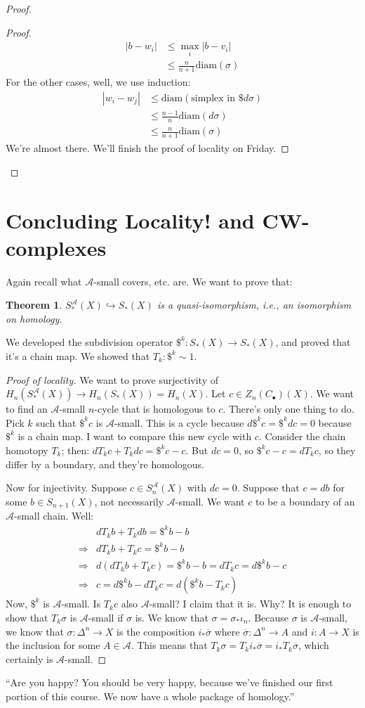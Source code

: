 \documentclass{amsart}
\theoremstyle{theorem}
\newtheorem{theorem}{Theorem}[section]
\theoremstyle{definition}
\newcommand{\sca}{\mathscr{A}}
\begin{document}
\begin{proof}
\begin{proof}
\begin{align*}
|b-w_i| & \leq\max_i|b-v_i|\\
 & \leq \frac{n}{n+1}\mathrm{diam}(\sigma)
\end{align*}
For the other cases, well, we use induction:
\begin{align*}
|w_i-w_j|& \leq \mathrm{diam}(\text{simplex in }\$d\sigma)\\
& \leq \frac{n-1}{n}\mathrm{diam}(d\sigma)\\
& \leq \frac{n}{n+1}\mathrm{diam}(\sigma)
\end{align*}
We're almost there. We'll finish the proof of locality on Friday.
\end{proof}
\end{proof}
\section{Concluding Locality! and CW-complexes}
Again recall what $\sca$-small covers, etc. are. We want to prove that:
\begin{theorem}
$S^\sca_\ast(X)\hookrightarrow S_\ast(X)$ is a quasi-isomorphism, i.e., an isomorphism on homology.
\end{theorem}
We developed the subdivision operator $\$^k:S_\ast(X)\to S_\ast(X)$, and proved that it's a chain map. We showed that $T_k:\$^k\sim 1$.
\begin{proof}[Proof of locality]
We want to prove surjectivity of $ H_n(S^\sca_\ast(X))\to H_n(S_\ast(X))= H_n(X)$. Let $c\in Z_n(C_\bullet)(X)$. We want to find an $\sca$-small $n$-cycle that is homologous to $c$. There's only one thing to do. Pick $k$ such that $\$^k c$ is $\sca$-small. This is a cycle because $d\$^k c=\$^k dc=0$ because $\$^k$ is a chain map. I want to compare this new cycle with $c$. Consider the chain homotopy $T_k$; then: $dT_k c+T_kdc=\$^kc-c$. But $dc=0$, so $\$^k c - c=dT_k c$, so they differ by a boundary, and they're homologous.

Now for injectivity. Suppose $c\in S^\sca_n(X)$ with $dc=0$. Suppose that $c=db$ for some $b\in S_{n+1}(X)$, not necessarily $\sca$-small. We want $c$ to be a boundary of an $\sca$-small chain. Well:
\begin{align*}
& dT_kb+T_kdb=\$^k b-b\\
\Rightarrow& dT_kb+T_kc=\$^k b-b\\
\Rightarrow& d(dT_kb+T_kc)=\$^kb-b=dT_kc=d\$^k b-c\\
\Rightarrow& c=d\$^kb-dT_kc=d(\$^k b-T_kc)
\end{align*}
Now, $\$^k$ is $\sca$-small. Is $T_kc$ also $\sca$-small? I claim that it is. Why? It is enough to show that $T_k\sigma$ is $\sca$-small if $\sigma$ is. We know that $\sigma=\sigma_\ast\iota_n$. Because $\sigma$ is $\sca$-small, we know that $\sigma:\Delta^n\to X$ is the composition $i_\ast\overline{\sigma}$ where $\overline{\sigma}:\Delta^n\to A$ and $i:A\to X$ is the inclusion for some $A\in\sca$. This means that $T_k\sigma=T_ki_\ast\overline{\sigma}=i_\ast T_k\overline{\sigma}$, which certainly is $\sca$-small.
\end{proof}
``Are you happy? You should be very happy, because we've finished our first portion of this course. We now have a whole package of homology.''
\end{document}
